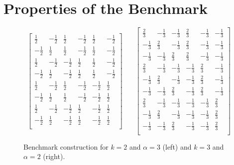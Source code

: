 \section{Properties of the Benchmark}

\begin{figure}[h]
\begin{center}
$$ 
\begin{bmatrix}
\frac{1}{2} & -\frac{1}{2} & \frac{1}{2} & -\frac{1}{2} & \frac{1}{2} & -\frac{1}{2}  \\
-\frac{1}{2} & \frac{1}{2} & \frac{1}{2} & -\frac{1}{2} & \frac{1}{2} & -\frac{1}{2} \\
\frac{1}{2} & -\frac{1}{2} & -\frac{1}{2} & \frac{1}{2} & \frac{1}{2} & -\frac{1}{2}  \\
-\frac{1}{2} & \frac{1}{2} & -\frac{1}{2} & \frac{1}{2} & \frac{1}{2} & -\frac{1}{2} \\
\frac{1}{2} & -\frac{1}{2} & \frac{1}{2} & -\frac{1}{2} & -\frac{1}{2} & \frac{1}{2}  \\
-\frac{1}{2} & \frac{1}{2} & \frac{1}{2} & -\frac{1}{2} & -\frac{1}{2} & \frac{1}{2}  \\
\frac{1}{2} & -\frac{1}{2} & -\frac{1}{2} & \frac{1}{2} &-\frac{1}{2} & \frac{1}{2} \\
-\frac{1}{2} & \frac{1}{2} & -\frac{1}{2} & \frac{1}{2}  & -\frac{1}{2} & \frac{1}{2} \\
\end{bmatrix} ~~~~~~~~
\begin{bmatrix}
 \frac{2}{3}   & -\frac{1}{3}  & -\frac{1}{3} & \frac{2}{3}   & -\frac{1}{3}  & -\frac{1}{3}   \\
 -\frac{1}{3}  & \frac{2}{3}   & -\frac{1}{3} & \frac{2}{3}   & -\frac{1}{3}  & -\frac{1}{3}   \\
 -\frac{1}{3}  & -\frac{1}{3}  & \frac{2}{3}  & \frac{2}{3}   & -\frac{1}{3}  & -\frac{1}{3}   \\
 \frac{2}{3}   & -\frac{1}{3}  & -\frac{1}{3} & -\frac{1}{3}  & \frac{2}{3}   & -\frac{1}{3}   \\
 -\frac{1}{3}  & \frac{2}{3}   & -\frac{1}{3} & -\frac{1}{3}  & \frac{2}{3}   & -\frac{1}{3}   \\
 -\frac{1}{3}  & -\frac{1}{3}  & \frac{2}{3}  & -\frac{1}{3}  & \frac{2}{3}   &  -\frac{1}{3}  \\
 \frac{2}{3}   & -\frac{1}{3}  & -\frac{1}{3} & -\frac{1}{3}  & -\frac{1}{3}  & \frac{2}{3}    \\
 -\frac{1}{3}  & \frac{2}{3}   & -\frac{1}{3} & -\frac{1}{3}  & -\frac{1}{3}  & \frac{2}{3}    \\
 -\frac{1}{3}  & -\frac{1}{3}  & \frac{2}{3}  & -\frac{1}{3}  & -\frac{1}{3}  & \frac{2}{3}    \\
\end{bmatrix} 
$$
\end{center}
\caption{Benchmark construction for $k=2$ and $\alpha=3$ (left) and $k=3$ and $\alpha=2$ (right).}
\label{fig:benchmark-small-instances}
\end{figure}


